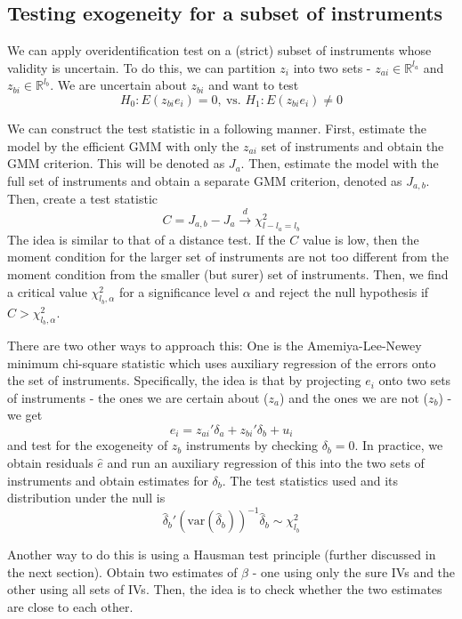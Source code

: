 \documentclass[12pt]{article}
\theoremstyle{definition}
\theoremstyle{property}
\theoremstyle{assumption}
\theoremstyle{example}
\theoremstyle{comment}
\begin{document}
\subsection{Testing exogeneity for a subset of instruments}
We can apply overidentification test on a (strict) subset of instruments whose validity is uncertain. To do this, we can partition $z_i$ into two sets - $z_{ai}\in\mathbb{R}^{l_a}$ and $z_{bi}\in\mathbb{R}^{l_b}$. We are uncertain about $z_{bi}$ and want to test 
\[
H_0: E(z_{bi}e_i)=0, \ \text{vs. }H_1:E(z_{bi}e_i)\neq0
\]\par
We can construct the test statistic in a following manner. First, estimate the model by the efficient GMM with only the $z_{ai}$ set of instruments and obtain the GMM criterion. This will be denoted as $J_a$. Then, estimate the model with the full set of instruments and obtain a separate GMM criterion, denoted as $J_{a,b}$. Then, create a test statistic
\[
C=J_{a,b}-J_a\xrightarrow{d}\chi^2_{l-l_a=l_b}
\]
The idea is similar to that of a distance test. If the $C$ value is low, then the moment condition for the larger set of instruments are not too different from the moment condition from the smaller (but surer) set of instruments. Then, we find a critical value $\chi_{l_b,\alpha}^2$ for a significance level $\alpha$ and reject the null hypothesis if $C>\chi_{l_b,\alpha}^2$. 
\par
There are two other ways to approach this: One is the Amemiya-Lee-Newey minimum chi-square statistic which uses auxiliary regression of the errors onto the set of instruments. Specifically, the idea is that by projecting $e_i$ onto two sets of instruments - the ones we are certain about ($z_a$) and the ones we are not ($z_b$) - we get
\[
e_i = z_{ai}'\delta_a+z_{bi}'\delta_b+u_i
\]
and test for the exogeneity of $z_b$ instruments by checking $\delta_b=0$. In practice, we obtain residuals $\hat{e}$ and run an auxiliary regression of this into the two sets of instruments and obtain estimates for $\delta_b$. The test statistics used and its distribution under the null is
\[
\hat{\delta}_b'(\text{var}(\hat{\delta}_b))^{-1}\hat{\delta}_b \sim \chi_{l_b}^2
\] \par
Another way to do this is using a Hausman test principle (further discussed in the next section). Obtain two estimates of $\beta$ - one using only the sure IVs and the other using all sets of IVs. Then, the idea is to check whether the two estimates are close to each other. 
\end{document}

